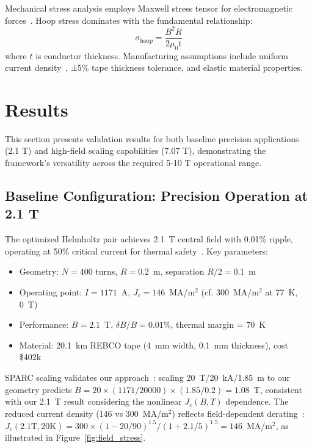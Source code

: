 \documentclass[10pt,twocolumn]{article}
\begin{document}
Mechanical stress analysis employs Maxwell stress tensor for electromagnetic forces~\cite{zhou2023}. Hoop stress dominates with the fundamental relationship:
\begin{equation}
\sigma_{\text{hoop}} = \frac{B^2R}{2\mu_0 t}
\label{eq:hoop_stress}
\end{equation}
where $t$ is conductor thickness. Manufacturing assumptions include uniform current density~\cite{superpower2023}, ±5\% tape thickness tolerance, and elastic material properties.

\section{Results}

This section presents validation results for both baseline precision applications (2.1 T) and high-field scaling capabilities (7.07 T), demonstrating the framework's versatility across the required 5-10 T operational range.

\subsection{Baseline Configuration: Precision Operation at 2.1 T}

The optimized Helmholtz pair achieves 2.1~T central field with 0.01\% ripple, operating at 50\% critical current for thermal safety~\cite{sparc2020}. Key parameters:
\begin{itemize}
\item Geometry: $N = 400$ turns, $R = 0.2$~m, separation $R/2 = 0.1$~m
\item Operating point: $I = 1171$~A, $J_c = 146$~MA/m$^2$ (cf. 300~MA/m$^2$ at 77~K, 0~T)
\item Performance: $B = 2.1$~T, $\delta B / B = 0.01\%$, thermal margin = 70~K
\item Material: 20.1~km REBCO tape (4~mm width, 0.1~mm thickness), cost \$402k
\end{itemize}

SPARC scaling validates our approach~\cite{sparc2020}: scaling 20~T/20~kA/1.85~m to our geometry predicts $B = 20 \times (1171/20000) \times (1.85/0.2) = 1.08$~T, consistent with our 2.1~T result considering the nonlinear $J_c(B,T)$ dependence. The reduced current density (146 vs 300~MA/m$^2$) reflects field-dependent derating~\cite{hahn2019,superpower2023}: $J_c(2.1\text{T}, 20\text{K}) = 300 \times (1-20/90)^{1.5} / (1+2.1/5)^{1.5} = 146$~MA/m$^2$, as illustrated in Figure~\ref{fig:field_stress}.
\end{document}
